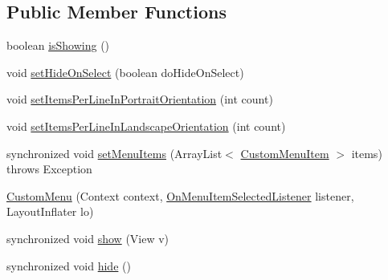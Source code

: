 \subsection*{Public Member Functions}
\begin{DoxyCompactItemize}
\item 
boolean \hyperlink{classcom_1_1zia_1_1freshdocs_1_1widget_1_1fileexplorer_1_1custommenu_1_1_custom_menu_ad4c8d654883427ae0f66cf5ff6d1a724}{is\-Showing} ()
\item 
void \hyperlink{classcom_1_1zia_1_1freshdocs_1_1widget_1_1fileexplorer_1_1custommenu_1_1_custom_menu_ab0634c7da27b67beeefbba2b8d37034c}{set\-Hide\-On\-Select} (boolean do\-Hide\-On\-Select)
\item 
void \hyperlink{classcom_1_1zia_1_1freshdocs_1_1widget_1_1fileexplorer_1_1custommenu_1_1_custom_menu_a6ee8821ba431c944468358a9754878ec}{set\-Items\-Per\-Line\-In\-Portrait\-Orientation} (int count)
\item 
void \hyperlink{classcom_1_1zia_1_1freshdocs_1_1widget_1_1fileexplorer_1_1custommenu_1_1_custom_menu_adba14c1abe1efd049f8839dfb4c6248c}{set\-Items\-Per\-Line\-In\-Landscape\-Orientation} (int count)
\item 
synchronized void \hyperlink{classcom_1_1zia_1_1freshdocs_1_1widget_1_1fileexplorer_1_1custommenu_1_1_custom_menu_a3ba53c0d1273a59a3255d1beb32377a8}{set\-Menu\-Items} (Array\-List$<$ \hyperlink{classcom_1_1zia_1_1freshdocs_1_1widget_1_1fileexplorer_1_1custommenu_1_1_custom_menu_item}{Custom\-Menu\-Item} $>$ items)  throws Exception 
\item 
\hyperlink{classcom_1_1zia_1_1freshdocs_1_1widget_1_1fileexplorer_1_1custommenu_1_1_custom_menu_aa4bc30f7818d47a3d22a27bd954d6a66}{Custom\-Menu} (Context context, \hyperlink{interfacecom_1_1zia_1_1freshdocs_1_1widget_1_1fileexplorer_1_1custommenu_1_1_custom_menu_1_1_on_menu_item_selected_listener}{On\-Menu\-Item\-Selected\-Listener} listener, Layout\-Inflater lo)
\item 
synchronized void \hyperlink{classcom_1_1zia_1_1freshdocs_1_1widget_1_1fileexplorer_1_1custommenu_1_1_custom_menu_af06c85c7aa77c4f79dfd991f92e755c5}{show} (View v)
\item 
synchronized void \hyperlink{classcom_1_1zia_1_1freshdocs_1_1widget_1_1fileexplorer_1_1custommenu_1_1_custom_menu_a6016ce2edb39cf259104690ad1824fbc}{hide} ()
\end{DoxyCompactItemize}


